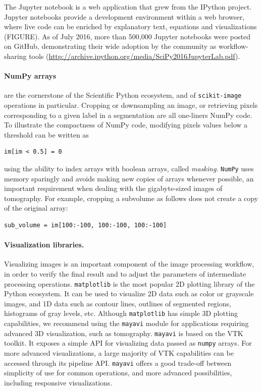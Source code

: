 \documentclass[twocolumn]{bmcart}%
\begin{document}
The Jupyter notebook \citep{Kluyver2016} is a web application that grew
from the IPython project. Jupyter notebooks provide a development
environment within a web browser, where live code can be enriched
by explanatory text, equations and visualizations (FIGURE).
As of July 2016, more than 500,000 Jupyter notebooks were posted on GitHub,
demonstrating their wide adoption by the community as workflow-sharing
tools (\url{http://archive.ipython.org/media/SciPy2016JupyterLab.pdf}).

\paragraph{NumPy arrays} are the cornerstone of the Scientific Python
ecosystem, and of \texttt{scikit-image} operations in particular.
Cropping or downsampling an image, or retrieving pixels corresponding to
a given label in a segmentation are all one-liners NumPy code. To
illustrate the compactness of NumPy code, modifying pixels values below a
threshold can be written as
\begin{lstlisting}
im[im < 0.5] = 0
\end{lstlisting}
using the ability to index arrays with boolean arrays, called
\emph{masking}. \texttt{NumPy} uses memory sparingly and avoids
making new copies of arrays whenever possible, an important
requirement when dealing with the gigabyte-sized images of tomography.
For example, cropping a subvolume as follows does not create a copy of the
original array:
\begin{lstlisting}
sub_volume = im[100:-100, 100:-100, 100:-100]
\end{lstlisting}


\paragraph{Visualization libraries.}

Visualizing images is an important component of the image processing
workflow, in order to verify the final result and to adjust the
parameters of intermediate processing operations.
\texttt{matplotlib} \citep{Hunter2007} is the most popular 2D plotting
library of the Python ecosystem. It can be used to visualize 2D data such
as color or grayscale images, and 1D data such as contour lines, outlines
of segmented regions, histograms of gray levels, etc. Although
\texttt{matplotlib} has simple 3D plotting capabilities, we
recommend using the \texttt{mayavi} module \citep{Ramachandran2011}
for applications requiring advanced 3D visualization, such as tomography. 
\texttt{mayavi} is based on the VTK toolkit. It exposes a simple API for
visualizing data passed as \texttt{numpy} arrays. For more advanced
visualizations, a large majority of VTK capabilities can be accessed
through its pipeline API.
\texttt{mayavi} offers a good trade-off between simplicity of use for
common operations, and more advanced possibilities, including responsive
visualizations.
\end{document}
